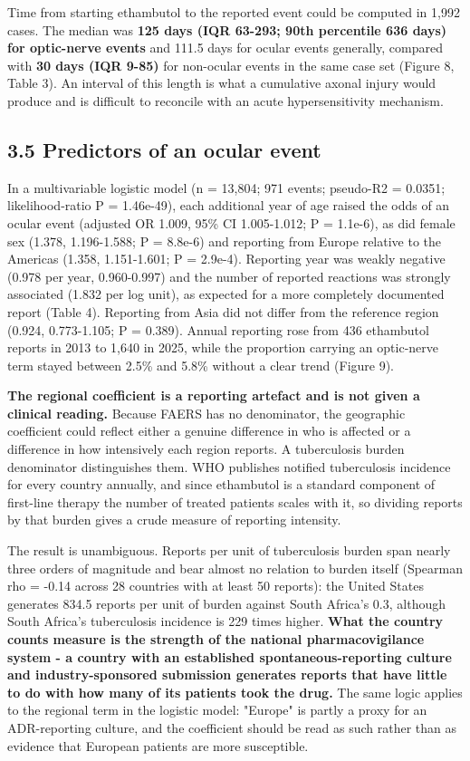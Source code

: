 \documentclass[utf8]{FrontiersinVancouver}
\begin{document}
Time from starting ethambutol to the reported event could be computed in 1,992 cases. The median was \textbf{125 days (IQR 63-293; 90th percentile 636 days) for optic-nerve events} and 111.5 days for ocular events generally, compared with \textbf{30 days (IQR 9-85)} for non-ocular events in the same case set (Figure 8, Table 3). An interval of this length is what a cumulative axonal injury would produce and is difficult to reconcile with an acute hypersensitivity mechanism.

\subsection{3.5 Predictors of an ocular event}

In a multivariable logistic model (n = 13,804; 971 events; pseudo-R2 = 0.0351; likelihood-ratio P = 1.46e-49), each additional year of age raised the odds of an ocular event (adjusted OR 1.009, 95\% CI 1.005-1.012; P = 1.1e-6), as did female sex (1.378, 1.196-1.588; P = 8.8e-6) and reporting from Europe relative to the Americas (1.358, 1.151-1.601; P = 2.9e-4). Reporting year was weakly negative (0.978 per year, 0.960-0.997) and the number of reported reactions was strongly associated (1.832 per log unit), as expected for a more completely documented report (Table 4). Reporting from Asia did not differ from the reference region (0.924, 0.773-1.105; P = 0.389). Annual reporting rose from 436 ethambutol reports in 2013 to 1,640 in 2025, while the proportion carrying an optic-nerve term stayed between 2.5\% and 5.8\% without a clear trend (Figure 9).

\textbf{The regional coefficient is a reporting artefact and is not given a clinical reading.} Because FAERS has no denominator, the geographic coefficient could reflect either a genuine difference in who is affected or a difference in how intensively each region reports. A tuberculosis burden denominator distinguishes them. WHO publishes notified tuberculosis incidence for every country annually, and since ethambutol is a standard component of first-line therapy the number of treated patients scales with it, so dividing reports by that burden gives a crude measure of reporting intensity.

The result is unambiguous. Reports per unit of tuberculosis burden span nearly three orders of magnitude and bear almost no relation to burden itself (Spearman rho = -0.14 across 28 countries with at least 50 reports): the United States generates 834.5 reports per unit of burden against South Africa's 0.3, although South Africa's tuberculosis incidence is 229 times higher. \textbf{What the country counts measure is the strength of the national pharmacovigilance system - a country with an established spontaneous-reporting culture and industry-sponsored submission generates reports that have little to do with how many of its patients took the drug.} The same logic applies to the regional term in the logistic model: "Europe" is partly a proxy for an ADR-reporting culture, and the coefficient should be read as such rather than as evidence that European patients are more susceptible.
\end{document}
